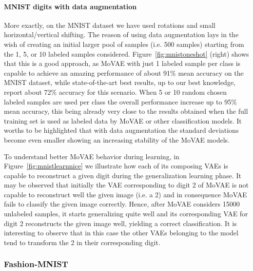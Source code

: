 \documentclass[sigconf,authorversion=true]{aamas}  %
\begin{document}
\begin{table}[t!]
\end{table}\paragraph{MNIST digits with data augmentation} More exactly, on the MNIST dataset we have used rotations and small horizontal/vertical shifting. The reason of using data augmentation lays in the wish of creating an initial larger pool of samples (i.e. 500 samples) starting from the 1, 5, or 10 labeled samples considered. Figure~\ref{fig:mnistoneshot} (right) shows that this is a good approach, as MoVAE with just 1 labeled sample per class is capable to achieve an amazing performance of about 91\% mean accuracy on the MNIST dataset, while state-of-the-art best results, up to our best knowledge, report about 72\% accuracy for this scenario. When 5 or 10 random chosen labeled samples are used per class the overall performance increase up to 95\% mean accuracy, this being already very close to the results obtained when the full training set is used as labeled data by MoVAE or other classification models. It worths to be highlighted that with data augmentation the standard deviations become even smaller showing an increasing stability of the MoVAE models.


To understand better MoVAE behavior during learning, in Figure~\ref{fig:mnistlearnnice} we illustrate how each of its composing VAEs is capable to reconstruct a given digit during the generalization learning phase. It may be observed that initially the VAE corresponding to digit 2 of MoVAE is not capable to reconstruct well the given image (i.e. a 2) and in consequence MoVAE fails to classify the given image correctly. Hence, after MoVAE considers 15000 unlabeled samples, it starts generalizing quite well and its corresponding VAE for digit 2 reconstructs the given image well, yielding a correct classification. It is interesting to observe that in this case the other VAEs belonging to the model tend to transform the 2 in their corresponding digit.

\subsubsection{Fashion-MNIST}
\end{document}
